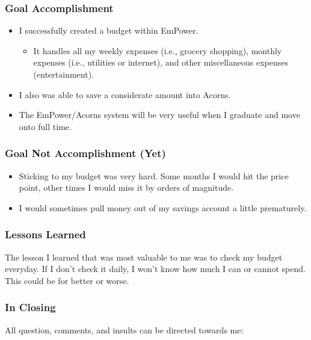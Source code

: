 \documentclass[xclolor=dvipsnames]{beamer}            %
\begin{document}
\begin{darkframes}
    \begin{frame}
        \frametitle{Goal Accomplishment}

        \begin{itemize}
            \item I successfully created a budget within EmPower.

                \begin{itemize}
                    \item It handles all my weekly expenses (i.e., grocery shopping), monthly expenses (i.e., utilities or internet), and other miscellaneous expenses (entertainment).
                \end{itemize}

            \item I also was able to save a considerate amount into Acorns.

            \item The EmPower/Acorns system will be very useful when I graduate and move onto full time.
        \end{itemize}
    \end{frame}

    \begin{frame}
        \frametitle{Goal Not Accomplishment (Yet)}

        \begin{itemize}
            \item Sticking to my budget was very hard. Some months I would hit the price point, other times I would miss it by orders of magnitude.
            \item I would sometimes pull money out of my savings account a little prematurely.
        \end{itemize}
    \end{frame}


    \begin{frame}
        \frametitle{Lessons Learned}

        The lesson I learned that was most valuable to me was to check my budget everyday. If I don't check it daily, I won't know how much I can or cannot spend. This could be for better or worse.

    \end{frame}

    \begin{frame}
        \frametitle{In Closing}

        All question, comments, and insults can be directed towards me:


\end{frame}
\end{darkframes}
\end{document}
